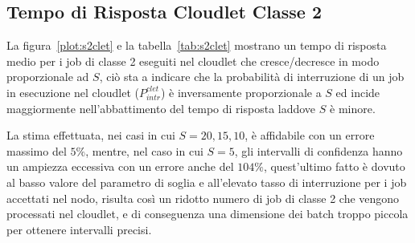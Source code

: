 \subsection{Tempo di Risposta Cloudlet Classe 2}
La figura~\ref{plot:s2clet} e la tabella~\ref{tab:s2clet} mostrano un tempo di
risposta medio per i job di classe 2 eseguiti nel cloudlet che cresce/decresce
in modo proporzionale ad $S$, ciò sta a indicare che la probabilità di
interruzione di un job in esecuzione nel cloudlet ($P_{intr}^{clet}$) è
inversamente proporzionale a $S$ ed incide maggiormente nell'abbattimento del
tempo di risposta laddove $S$ è minore.

La stima effettuata, nei casi in cui $S=20,15,10$, è affidabile con un errore
massimo del $5\%$, mentre, nel caso in cui $S=5$, gli intervalli di confidenza
hanno un ampiezza eccessiva con un errore anche del $104\%$, quest'ultimo fatto
è dovuto al basso valore del parametro di soglia e all'elevato tasso di
interruzione per i job accettati nel nodo, risulta così un ridotto numero di job
di classe 2 che vengono processati nel cloudlet, e di conseguenza una dimensione
dei batch troppo piccola per ottenere intervalli precisi.
